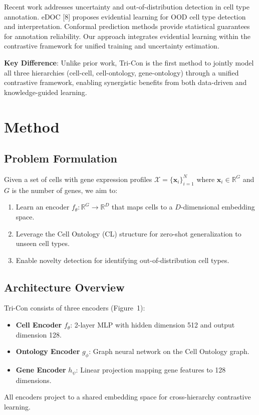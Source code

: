 \documentclass[11pt]{article}
\begin{document}
Recent work addresses uncertainty and out-of-distribution detection in cell type annotation. eDOC [8] proposes evidential learning for OOD cell type detection and interpretation. Conformal prediction methods provide statistical guarantees for annotation reliability. Our approach integrates evidential learning within the contrastive framework for unified training and uncertainty estimation.

\textbf{Key Difference}: Unlike prior work, Tri-Con is the first method to jointly model all three hierarchies (cell-cell, cell-ontology, gene-ontology) through a unified contrastive framework, enabling synergistic benefits from both data-driven and knowledge-guided learning.

\section{Method}

\subsection{Problem Formulation}

Given a set of cells with gene expression profiles $\mathcal{X} = \{\mathbf{x}_i\}_{i=1}^N$ where $\mathbf{x}_i \in \mathbb{R}^G$ and $G$ is the number of genes, we aim to:
\begin{enumerate}
    \item Learn an encoder $f_\theta: \mathbb{R}^G \rightarrow \mathbb{R}^D$ that maps cells to a $D$-dimensional embedding space.
    \item Leverage the Cell Ontology (CL) structure for zero-shot generalization to unseen cell types.
    \item Enable novelty detection for identifying out-of-distribution cell types.
\end{enumerate}

\subsection{Architecture Overview}

Tri-Con consists of three encoders (Figure~1):
\begin{itemize}
    \item \textbf{Cell Encoder} $f_\theta$: 2-layer MLP with hidden dimension 512 and output dimension 128.
    \item \textbf{Ontology Encoder} $g_\phi$: Graph neural network on the Cell Ontology graph.
    \item \textbf{Gene Encoder} $h_\psi$: Linear projection mapping gene features to 128 dimensions.
\end{itemize}
All encoders project to a shared embedding space for cross-hierarchy contrastive learning.
\end{document}
